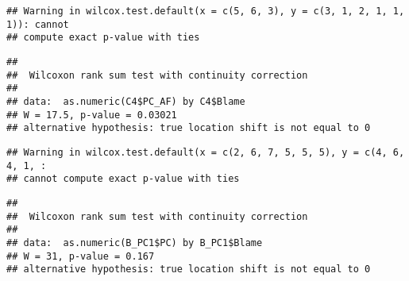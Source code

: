 \documentclass[
]{article}
\newenvironment{Shaded}{\begin{snugshade}}{\end{snugshade}}
\newcommand{\CommentTok}[1]{\textcolor[rgb]{0.56,0.35,0.01}{\textit{#1}}}
\newcommand{\DecValTok}[1]{\textcolor[rgb]{0.00,0.00,0.81}{#1}}
\newcommand{\KeywordTok}[1]{\textcolor[rgb]{0.13,0.29,0.53}{\textbf{#1}}}
\newcommand{\NormalTok}[1]{#1}
\newcommand{\OperatorTok}[1]{\textcolor[rgb]{0.81,0.36,0.00}{\textbf{#1}}}
\newcommand{\StringTok}[1]{\textcolor[rgb]{0.31,0.60,0.02}{#1}}
\begin{document}
\begin{verbatim}
## Warning in wilcox.test.default(x = c(5, 6, 3), y = c(3, 1, 2, 1, 1, 1)): cannot
## compute exact p-value with ties
\end{verbatim}

\begin{verbatim}
## 
##  Wilcoxon rank sum test with continuity correction
## 
## data:  as.numeric(C4$PC_AF) by C4$Blame
## W = 17.5, p-value = 0.03021
## alternative hypothesis: true location shift is not equal to 0
\end{verbatim}

\begin{Shaded}
\end{Shaded}

\begin{verbatim}
## Warning in wilcox.test.default(x = c(2, 6, 7, 5, 5, 5), y = c(4, 6, 4, 1, :
## cannot compute exact p-value with ties
\end{verbatim}

\begin{verbatim}
## 
##  Wilcoxon rank sum test with continuity correction
## 
## data:  as.numeric(B_PC1$PC) by B_PC1$Blame
## W = 31, p-value = 0.167
## alternative hypothesis: true location shift is not equal to 0
\end{verbatim}

\begin{Shaded}
\end{Shaded}
\end{document}
